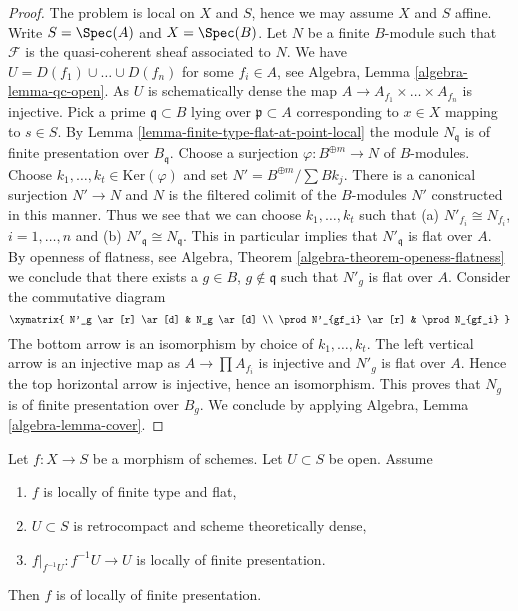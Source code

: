 \begin{proof}
The problem is local on $X$ and $S$, hence we may assume $X$ and $S$ affine.
Write $S = \Spec(A)$ and $X = \Spec(B)$. Let $N$ be a finite $B$-module such
that $\mathcal{F}$ is the quasi-coherent sheaf associated to $N$.
We have $U = D(f_1) \cup \ldots \cup D(f_n)$ for some $f_i \in A$, see
Algebra, Lemma \ref{algebra-lemma-qc-open}.
As $U$ is schematically dense the map
$A \to A_{f_1} \times \ldots \times A_{f_n}$ is injective.
Pick a prime $\mathfrak q \subset B$ lying over $\mathfrak p \subset A$
corresponding to $x \in X$ mapping to $s \in S$.
By Lemma \ref{lemma-finite-type-flat-at-point-local}
the module $N_\mathfrak q$ is of finite presentation over $B_\mathfrak q$.
Choose a surjection $\varphi : B^{\oplus m} \to N$ of $B$-modules.
Choose $k_1, \ldots, k_t \in \text{Ker}(\varphi)$ and
set $N' = B^{\oplus m}/\sum Bk_j$. There is a canonical surjection
$N' \to N$ and $N$ is the filtered colimit of the $B$-modules $N'$
constructed in this manner. Thus we see that we can choose
$k_1, \ldots, k_t$ such that (a) $N'_{f_i} \cong N_{f_i}$, $i = 1, \ldots, n$
and (b) $N'_\mathfrak q \cong N_\mathfrak q$.
This in particular implies that $N'_\mathfrak q$ is flat over $A$.
By openness of flatness, see
Algebra, Theorem \ref{algebra-theorem-openess-flatness}
we conclude that there exists a $g \in B$, $g \not \in \mathfrak q$
such that $N'_g$ is flat over $A$. Consider the commutative diagram
$$
\xymatrix{
N'_g \ar[r] \ar[d] & N_g \ar[d] \\
\prod N'_{gf_i} \ar[r] & \prod N_{gf_i}
}
$$
The bottom arrow is an isomorphism by choice of $k_1, \ldots, k_t$.
The left vertical arrow is an injective map as
$A \to \prod A_{f_i}$ is injective and $N'_g$ is flat over $A$.
Hence the top horizontal arrow is injective, hence an isomorphism.
This proves that $N_g$ is of finite presentation over $B_g$.
We conclude by applying
Algebra, Lemma \ref{algebra-lemma-cover}.
\end{proof}

\begin{lemma}
\label{lemma-flat-finite-type-finitely-presented-over-dense-open-X}
Let $f : X \to S$ be a morphism of schemes. Let $U \subset S$ be open.
Assume
\begin{enumerate}
\item $f$ is locally of finite type and flat,
\item $U \subset S$ is retrocompact and scheme theoretically dense,
\item $f|_{f^{-1}U} : f^{-1}U \to U$ is locally of finite presentation.
\end{enumerate}
Then $f$ is of locally of finite presentation.
\end{lemma}

